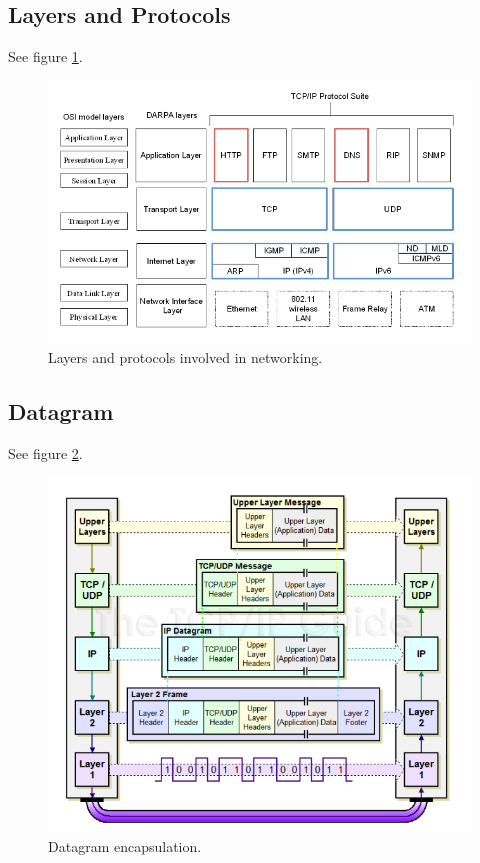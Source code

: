 \documentclass[11pt]{article}
\begin{document}
\subsection{Layers and Protocols}
See figure \ref{fig:layers}.
\begin{figure}[htb!]
  \centering
  \caption{Layers and protocols involved in networking.}
  \label{fig:layers}
  \includegraphics[scale=0.4]{layers}
\end{figure}

\subsection{Datagram}
See figure \ref{fig:datagram}.
\begin{figure}[htb!]
  \centering
  \caption{Datagram encapsulation.}
  \label{fig:datagram}
  \includegraphics[scale=0.4]{datagram}
\end{figure}
\end{document}
